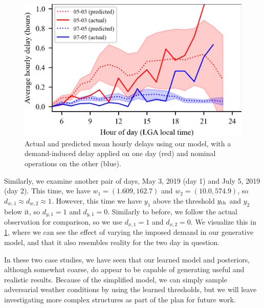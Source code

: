 \begin{figure}[htb!]
    \centering
    \includegraphics[width=0.7\linewidth]{media/posterior_predictive_comparison_alt.png}
    \caption{Actual and predicted mean hourly delays using our model, with a demand-induced delay applied on one day (red) and nominal operations on the other (blue).}
    \label{fig:pp-comparison-alt}
\end{figure}


Similarly, we examine another pair of days, May 3, 2019 (day 1) and July 5, 2019 (day 2). This time, we have $w_1=(1.609,162.7)$ and $w_2=(10.0,574.9)$, so $d_{w,1}\approx d_{w,2}\approx 1$. However, this time we have $y_1$ above the threshold $y_{\mathrm{th}}$ and $y_2$ below it, so $d_{y,1}=1$ and $d_{y,1}=0$. Similarly to before, we follow the actual observation for comparison, so we use $d_{x,1}=1$ and $d_{x,2}=0$. We visualize this in \cref{fig:pp-comparison-alt}, where we can see the effect of varying the imposed demand in our generative model, and that it also resembles reality for the two day in question.

In these two case studies, we have seen that our learned model and posteriors, although somewhat coarse, do appear to be capable of generating useful and realistic results. Because of the simplified model, we can simply sample adversarial weather conditions by using the learned thresholds, but we will leave investigating more complex structures as part of the plan for future work.